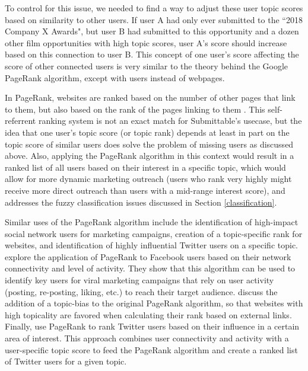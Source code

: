 \documentclass[]{report}   %
\begin{document}
To control for this issue, we needed to find a way to adjust these user topic scores based on similarity to other users. If user A had only ever submitted to the ``2018 Company X Awards", but user B had submitted to this opportunity and a dozen other film opportunities with high topic scores, user A's score should increase based on this connection to user B. This concept of one user's score affecting the score of other connected users is very similar to the theory behind the Google PageRank algorithm, except with users instead of webpages. 

In PageRank, websites are ranked based on the number of other pages that link to them, but also based on the rank of the pages linking to them \cite{page_brin_motwani_winograd_1999}. This self-referrent ranking system is not an exact match for Submittable's usecase, but the idea that one user's topic score (or topic rank) depends at least in part on the topic score of similar users does solve the problem of missing users as discussed above. Also, applying the PageRank algorithm in this context would result in a ranked list of all users based on their interest in a specific topic, which would allow for more dynamic marketing outreach (users who rank very highly might receive more direct outreach than users with a mid-range interest score), and addresses the fuzzy classification issues discussed in Section \ref{classification}.

Similar uses of the PageRank algorithm include the identification of high-impact social network users for marketing campaigns, creation of a topic-specific rank for websites, and identification of highly influential Twitter users on a specific topic.  explore the application of PageRank to Facebook users based on their network connectivity and level of activity. They show that this algorithm can be used to identify key users for viral marketing campaigns that rely on user activity (posting, re-posting, liking, etc.) to reach their target audience.   discuss the addition of a topic-bias to the original PageRank algorithm, so that websites with high topicality are favored when calculating their rank based on external links. Finally,  use PageRank to rank Twitter users based on their influence in a certain area of interest. This approach combines user connectivity and activity with a user-specific topic score to feed the PageRank algorithm and create a ranked list of Twitter users for a given topic.
\end{document}
